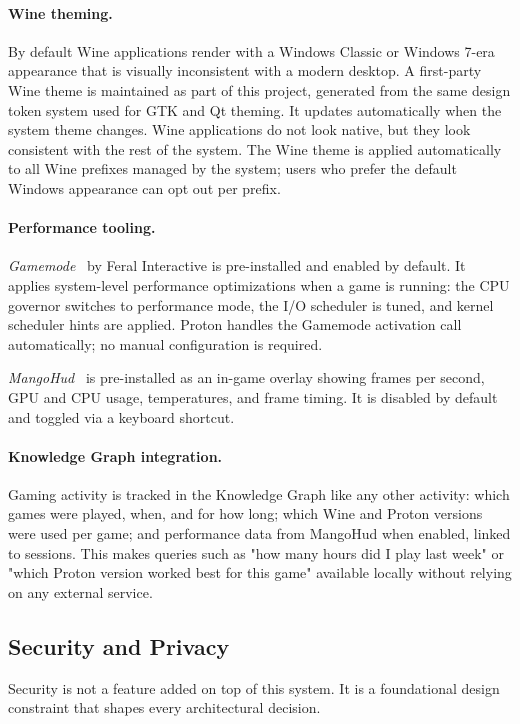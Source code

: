 \paragraph{Wine theming.}
By default Wine applications render with a Windows Classic or Windows 7-era
appearance that is visually inconsistent with a modern desktop. A first-party
Wine theme is maintained as part of this project, generated from the same
design token system used for GTK and Qt theming. It updates automatically
when the system theme changes. Wine applications do not look native, but they
look consistent with the rest of the system. The Wine theme is applied
automatically to all Wine prefixes managed by the system; users who prefer
the default Windows appearance can opt out per prefix.

\paragraph{Performance tooling.}
\emph{Gamemode}~\cite{gamemode} by Feral Interactive is pre-installed and
enabled by default. It applies system-level performance optimizations when a
game is running: the CPU governor switches to performance mode, the I/O
scheduler is tuned, and kernel scheduler hints are applied. Proton handles the
Gamemode activation call automatically; no manual configuration is required.

\emph{MangoHud}~\cite{mangohud} is pre-installed as an in-game overlay showing
frames per second, GPU and CPU usage, temperatures, and frame timing. It is
disabled by default and toggled via a keyboard shortcut.

\paragraph{Knowledge Graph integration.}
Gaming activity is tracked in the Knowledge Graph like any other activity:
which games were played, when, and for how long; which Wine and Proton versions
were used per game; and performance data from MangoHud when enabled, linked to
sessions. This makes queries such as "how many hours did I play last week" or
"which Proton version worked best for this game" available locally without
relying on any external service.

\subsection{Security and Privacy}
\label{sec:security}

Security is not a feature added on top of this system. It is a foundational
design constraint that shapes every architectural decision.

